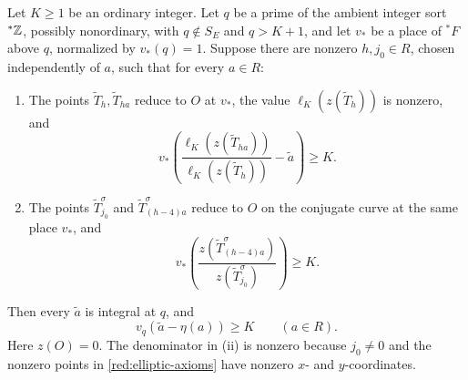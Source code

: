 \begin{samepage}
\begin{lemma}\label{red:local-comparison}
Let \(K\ge1\) be an ordinary integer. Let \(q\) be a prime of the
ambient integer sort \({}^*\mathbb Z\), possibly nonordinary, with
\(q\notin S_E\) and \(q>K+1\), and let \(v_*\) be a place of
\({}^*F\) above \(q\), normalized by \(v_*(q)=1\).
Suppose there are nonzero \(h,j_0\in R\), chosen independently of
\(a\), such that for every \(a\in R\):
\begin{enumerate}[label=(\roman*),leftmargin=*]
\item The points \(\widetilde T_h,\widetilde T_{ha}\) reduce to \(O\)
at \(v_*\), the value \(\ell_K(z(\widetilde T_h))\) is nonzero, and
\[
 v_*\!\left(
 \frac{\ell_K(z(\widetilde T_{ha}))}{\ell_K(z(\widetilde T_h))}
                   -\widetilde a\right)\ge K.
\]
\item The points \(\widetilde T_{j_0}^{\sigma}\) and
\(\widetilde T_{(h-4)a}^{\sigma}\) reduce to \(O\) on the conjugate
curve at the same place \(v_*\), and
\[
 v_*\!\left(
 \frac{z(\widetilde T_{(h-4)a}^{\sigma})}
      {z(\widetilde T_{j_0}^{\sigma})}\right)\ge K.
\]
\end{enumerate}
Then every \(\widetilde a\) is integral at \(q\), and
\[
                       v_q(\widetilde a-\eta(a))\ge K
                       \qquad(a\in R).
\]
Here \(z(O)=0\). The denominator in (ii) is nonzero because
\(j_0\ne0\) and the nonzero points in \eqref{red:elliptic-axioms}
have nonzero \(x\)- and \(y\)-coordinates.
\end{lemma}
\end{samepage}

